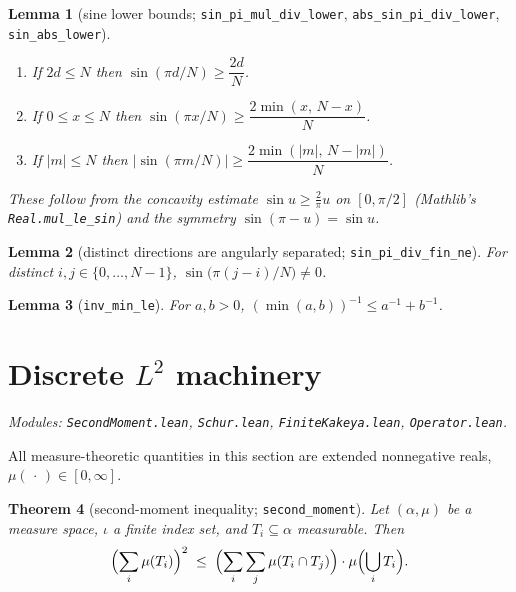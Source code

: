 \documentclass[11pt,a4paper]{article}
\newcommand{\ennr}{\ensuremath{[0,\infty]}}          %
\newcommand{\lname}[1]{\texttt{#1}}                  %
\newcommand{\lb}{\_\allowbreak}                      %
\newtheorem{theorem}{Theorem}[section]
\newtheorem{lemma}[theorem]{Lemma}
\theoremstyle{definition}
\theoremstyle{remark}
\begin{document}
\begin{lemma}[{sine lower bounds; \lname{sin\lb pi\lb mul\lb div\lb lower},
\lname{abs\lb sin\lb pi\lb div\lb lower}, \lname{sin\lb abs\lb lower}}]\ 
\begin{enumerate}
\item If $2d\le N$ then $\sin(\pi d/N)\ge \dfrac{2d}{N}$.
\item If $0\le x\le N$ then $\sin(\pi x/N)\ge \dfrac{2\min(x,\,N-x)}{N}$.
\item If $|m|\le N$ then
$\bigl|\sin(\pi m/N)\bigr|\ge \dfrac{2\min(|m|,\,N-|m|)}{N}$.
\end{enumerate}
\emph{These follow from the concavity estimate $\sin u\ge \tfrac{2}{\pi}u$ on
$[0,\pi/2]$ (Mathlib's \lname{Real.mul\_le\_sin}) and the symmetry
$\sin(\pi - u)=\sin u$.}
\end{lemma}

\begin{lemma}[{distinct directions are angularly separated;
\lname{sin\_pi\_div\_fin\_ne}}]
For distinct $i,j\in\{0,\dots,N-1\}$, $\sin\bigl(\pi(j-i)/N\bigr)\neq 0$.
\end{lemma}

\begin{lemma}[{\lname{inv\_min\_le}}] For $a,b>0$,
$(\min(a,b))^{-1}\le a^{-1}+b^{-1}$.
\end{lemma}

\section{Discrete $L^2$ machinery}

\emph{Modules: \lname{SecondMoment.lean}, \lname{Schur.lean}, \lname{FiniteKakeya.lean},
\lname{Operator.lean}.}

\medskip
All measure-theoretic quantities in this section are extended nonnegative reals,
$\mu(\,\cdot\,)\in\ennr$.

\begin{theorem}[{second-moment inequality; \lname{second\_moment}}]
\label{thm:second-moment}
Let $(\alpha,\mu)$ be a measure space, $\iota$ a finite index set, and
$T_i\subseteq\alpha$ measurable.  Then
\[
  \Bigl(\sum_i \mu(T_i)\Bigr)^{2}
    \;\le\; \Bigl(\sum_{i}\sum_{j} \mu(T_i\cap T_j)\Bigr)\cdot
             \mu\Bigl(\bigcup_i T_i\Bigr).
\]
\end{theorem}
\end{document}
